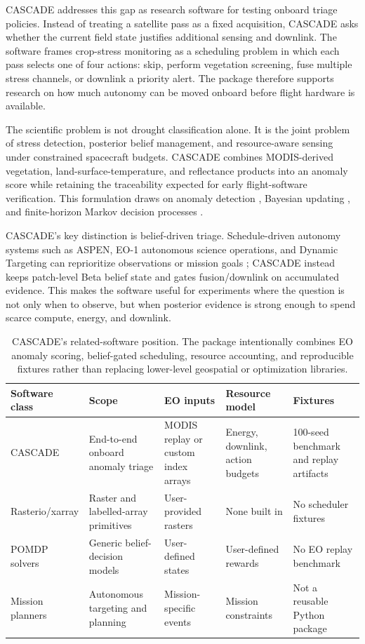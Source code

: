 \documentclass[preprint,12pt,a4paper]{elsarticle}
\begin{document}
CASCADE addresses this gap as research software for testing onboard triage policies. Instead of treating a satellite pass as a fixed acquisition, CASCADE asks whether the current field state justifies additional sensing and downlink. The software frames crop-stress monitoring as a scheduling problem in which each pass selects one of four actions: skip, perform vegetation screening, fuse multiple stress channels, or downlink a priority alert. The package therefore supports research on how much autonomy can be moved onboard before flight hardware is available.

The scientific problem is not drought classification alone. It is the joint problem of stress detection, posterior belief management, and resource-aware sensing under constrained spacecraft budgets. CASCADE combines MODIS-derived vegetation, land-surface-temperature, and reflectance products \cite{mod13a1,mod11a1,mod09a1} into an anomaly score while retaining the traceability expected for early flight-software verification. This formulation draws on anomaly detection \cite{chandola-2009}, Bayesian updating \cite{gelman-2013}, and finite-horizon Markov decision processes \cite{puterman-1994}.

CASCADE's key distinction is belief-driven triage. Schedule-driven autonomy systems such as ASPEN, EO-1 autonomous science operations, and Dynamic Targeting can reprioritize observations or mission goals \cite{aspen-spaceops,eo1-autonomy,dynamic-targeting}; CASCADE instead keeps patch-level Beta belief state and gates fusion/downlink on accumulated evidence. This makes the software useful for experiments where the question is not only when to observe, but when posterior evidence is strong enough to spend scarce compute, energy, and downlink.

\begin{table}[!h]
\centering
\scriptsize
\setlength{\tabcolsep}{2pt}
\renewcommand{\arraystretch}{1.12}
\begin{tabular}{p{2.1cm}p{2.45cm}p{2.1cm}p{2.15cm}p{2.15cm}}
\toprule
Software class & Scope & EO inputs & Resource model & Fixtures \\
\midrule
CASCADE & End-to-end onboard anomaly triage & MODIS replay or custom index arrays & Energy, downlink, action budgets & 100-seed benchmark and replay artifacts \\
Rasterio/xarray & Raster and labelled-array primitives & User-provided rasters & None built in & No scheduler fixtures \\
POMDP solvers & Generic belief-decision models & User-defined states & User-defined rewards & No EO replay benchmark \\
Mission planners & Autonomous targeting and planning & Mission-specific events & Mission constraints & Not a reusable Python package \\
\bottomrule
\end{tabular}
\caption{CASCADE's related-software position. The package intentionally combines EO anomaly scoring, belief-gated scheduling, resource accounting, and reproducible fixtures rather than replacing lower-level geospatial or optimization libraries.}
\label{tab:related-software}
\end{table}
\end{document}
